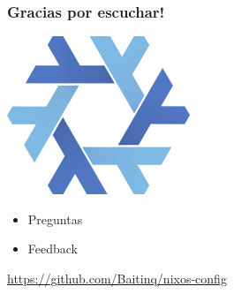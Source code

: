 \documentclass[aspectratio=43]{beamer}
\begin{document}
\begin{frame}
    \frametitle{Gracias por escuchar!}
    \begin{center}
            \includegraphics[scale=0.4]{img/207px-Home-nixos-logo.png}
            \begin{itemize}
                \item Preguntas
                \item Feedback
            \end{itemize}
    \end{center}
    \vspace{44}
    \href{https://github.com/Baitinq/nixos-config}{https://github.com/Baitinq/nixos-config}
\end{frame}
\end{document}
